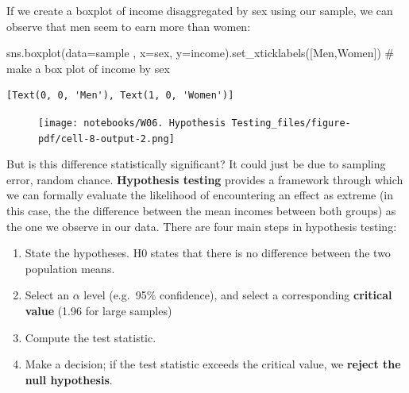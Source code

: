 \documentclass[
  letterpaper,
  DIV=11,
  numbers=noendperiod]{scrreprt}
\newenvironment{Shaded}{\begin{snugshade}}{\end{snugshade}}
\newcommand{\CommentTok}[1]{\textcolor[rgb]{0.37,0.37,0.37}{#1}}
\newcommand{\NormalTok}[1]{\textcolor[rgb]{0.00,0.23,0.31}{#1}}
\newcommand{\OperatorTok}[1]{\textcolor[rgb]{0.37,0.37,0.37}{#1}}
\newcommand{\StringTok}[1]{\textcolor[rgb]{0.13,0.47,0.30}{#1}}
\providecommand{\tightlist}{%
  \setlength{\itemsep}{0pt}\setlength{\parskip}{0pt}}\usepackage{longtable,booktabs,array}
\begin{document}
If we create a boxplot of income disaggregated by sex using our sample,
we can observe that men seem to earn more than women:

\begin{Shaded}
\begin{Highlighting}[]
\NormalTok{sns.boxplot(data}\OperatorTok{=}\NormalTok{sample , x}\OperatorTok{=}\StringTok{\textquotesingle{}sex\textquotesingle{}}\NormalTok{, y}\OperatorTok{=}\StringTok{\textquotesingle{}income\textquotesingle{}}\NormalTok{).set\_xticklabels([}\StringTok{\textquotesingle{}Men\textquotesingle{}}\NormalTok{,}\StringTok{\textquotesingle{}Women\textquotesingle{}}\NormalTok{]) }\CommentTok{\# make a box plot of income by sex}
\end{Highlighting}
\end{Shaded}

\begin{verbatim}
[Text(0, 0, 'Men'), Text(1, 0, 'Women')]
\end{verbatim}

\begin{figure}[H]

{\centering \texttt{[image: notebooks/W06. Hypothesis Testing\_files/figure-pdf/cell-8-output-2.png]}

}

\end{figure}

But is this difference statistically significant? It could just be due
to sampling error, random chance. \textbf{Hypothesis testing} provides a
framework through which we can formally evaluate the likelihood of
encountering an effect as extreme (in this case, the the difference
between the mean incomes between both groups) as the one we observe in
our data. There are four main steps in hypothesis testing:

\begin{enumerate}
\def\labelenumi{\arabic{enumi}.}
\tightlist
\item
  State the hypotheses. H0 states that there is no difference between
  the two population means.
\item
  Select an \(\alpha\) level (e.g.~95\% confidence), and select a
  corresponding \textbf{critical value} (1.96 for large samples)
\item
  Compute the test statistic.
\item
  Make a decision; if the test statistic exceeds the critical value, we
  \textbf{reject the null hypothesis}.
\end{enumerate}
\end{document}
